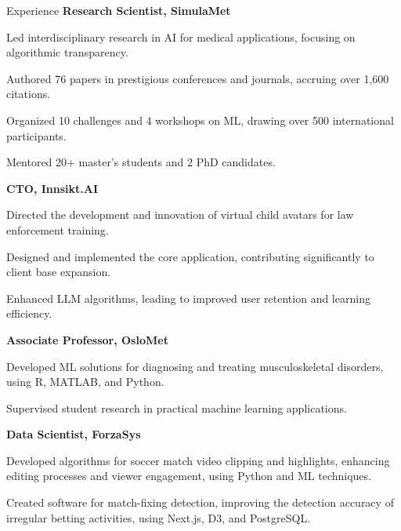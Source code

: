 \begin{rubric}{Experience}
%
\entry*[2021 -- present]%
\textbf{Research Scientist, SimulaMet} \par
\begin{compactitem}
\item Led interdisciplinary research in AI for medical applications, focusing on algorithmic transparency.
\item Authored 76 papers in prestigious conferences and journals, accruing over 1,600 citations.
\item Organized 10 challenges and 4 workshops on ML, drawing over 500 international participants.
\item Mentored 20+ master's students and 2 PhD candidates.
\vspace{-12pt}
\end{compactitem}
%
\entry*[2023 -- present]%
\textbf{CTO, Innsikt.AI} \par
\begin{compactitem}
\item Directed the development and innovation of virtual child avatars for law enforcement training.
\item Designed and implemented the core application, contributing significantly to client base expansion.
\item Enhanced LLM algorithms, leading to improved user retention and learning efficiency.
\vspace{-12pt}
\end{compactitem}
%
\entry*[2023 -- present]%
\textbf{Associate Professor, OsloMet} \par
\begin{compactitem}
\item Developed ML solutions for diagnosing and treating musculoskeletal disorders, using R, MATLAB, and Python.
\item Supervised student research in practical machine learning applications.
\vspace{-12pt}
\end{compactitem}
%
\entry*[2022 -- 2023]%
\textbf{Data Scientist, ForzaSys} \par
\begin{compactitem}
\item Developed algorithms for soccer match video clipping and highlights, enhancing editing processes and viewer engagement, using Python and ML techniques.
\item Created software for match-fixing detection, improving the detection accuracy of irregular betting activities, using Next.js, D3, and PostgreSQL.

\end{compactitem}
\end{rubric}
